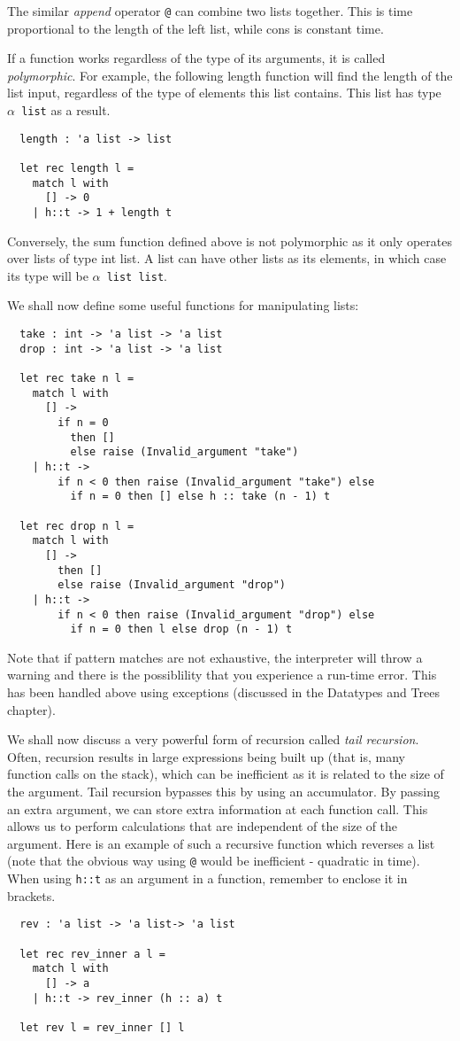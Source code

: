 \documentclass[12pt]{article}
\begin{document}
The similar \textit{append} operator \texttt{@} can combine two lists together. This is time proportional to the length of the left list,
while cons is constant time.

If a function works regardless of the type of its arguments, it is called \textit{polymorphic}. For example, the following length
function will find the length of the list input, regardless of the type of elements this list contains. This list has type \texttt{$\alpha$ list} as
a result.
\begin{lstlisting}
  length : 'a list -> list

  let rec length l =
    match l with
      [] -> 0
    | h::t -> 1 + length t
\end{lstlisting}
Conversely, the sum function defined above is not polymorphic as it only operates over lists of type int list. A list can have
other lists as its elements, in which case its type will be \texttt{$\alpha$ list list}.

We shall now define some useful functions for manipulating lists:
\begin{lstlisting}
  take : int -> 'a list -> 'a list
  drop : int -> 'a list -> 'a list

  let rec take n l =
    match l with
      [] ->
        if n = 0
          then []
          else raise (Invalid_argument "take")
    | h::t ->
        if n < 0 then raise (Invalid_argument "take") else
          if n = 0 then [] else h :: take (n - 1) t

  let rec drop n l =
    match l with
      [] ->
        then []
        else raise (Invalid_argument "drop")
    | h::t ->
        if n < 0 then raise (Invalid_argument "drop") else
          if n = 0 then l else drop (n - 1) t
\end{lstlisting}
Note that if pattern matches are not exhaustive, the interpreter will throw a warning
and there is the possiblility that you experience a run-time error. This has been handled
above using exceptions (discussed in the Datatypes and Trees chapter).

We shall now discuss a very powerful form of recursion called \textit{tail recursion}. Often, recursion results in
large expressions being built up (that is, many function calls on the stack), which can be inefficient as it is related to the
size of the argument. Tail recursion
bypasses this by using an accumulator. By passing an extra argument, we can store extra information at each function
call. This allows us to perform calculations that are independent of the size of the argument. Here is an example of
such a recursive function which reverses a list (note that the obvious way using \texttt{@} would be inefficient - quadratic in time).
When using \texttt{h::t} as an argument in a function, remember to enclose it in brackets.
\begin{lstlisting}
  rev : 'a list -> 'a list-> 'a list

  let rec rev_inner a l =
    match l with
      [] -> a
    | h::t -> rev_inner (h :: a) t

  let rev l = rev_inner [] l
\end{lstlisting}
\end{document}
